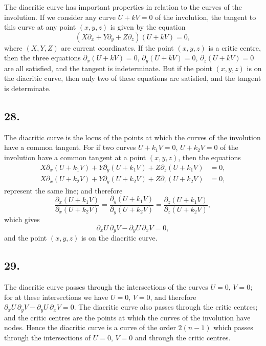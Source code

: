 \documentclass[11pt,a4paper]{article}
\theoremstyle{definition}
\begin{document}
The diacritic curve has important properties in relation to the curves of the involution.
If we consider any curve $U + kV = 0$ of the involution, the tangent to this curve at any
point $(x, y, z)$ is given by the equation
\[
(X\partial_{x} + Y\partial_{y} + Z\partial_{z})(U + kV) = 0,
\]
where $(X, Y, Z)$ are current coordinates. If the point $(x, y, z)$ is a critic centre, then the
three equations $\partial_{x}(U + kV) = 0$, $\partial_{y}(U + kV) = 0$, $\partial_{z}(U + kV) = 0$ are all satisfied, and the
tangent is indeterminate. But if the point $(x, y, z)$ is on the diacritic curve, then only
two of these equations are satisfied, and the tangent is determinate.

\subsection*{28.}

The diacritic curve is the locus of the points at which the curves of the involution
have a common tangent. For if two curves $U + k_{1}V = 0$, $U + k_{2}V = 0$ of the involution
have a common tangent at a point $(x, y, z)$, then the equations
\begin{align*}
X\partial_{x}(U + k_{1}V) + Y\partial_{y}(U + k_{1}V) + Z\partial_{z}(U + k_{1}V) &= 0,\\
X\partial_{x}(U + k_{2}V) + Y\partial_{y}(U + k_{2}V) + Z\partial_{z}(U + k_{2}V) &= 0,
\end{align*}
represent the same line; and therefore
\[
\frac{\partial_{x}(U + k_{1}V)}{\partial_{x}(U + k_{2}V)} =
\frac{\partial_{y}(U + k_{1}V)}{\partial_{y}(U + k_{2}V)} =
\frac{\partial_{z}(U + k_{1}V)}{\partial_{z}(U + k_{2}V)},
\]
which gives
\[
\partial_{x}U\,\partial_{y}V - \partial_{y}U\,\partial_{x}V = 0,
\]
and the point $(x, y, z)$ is on the diacritic curve.

\newpage
\subsection*{29.}

The diacritic curve passes through the intersections of the curves $U = 0$, $V = 0$; for at
these intersections we have $U = 0$, $V = 0$, and therefore $\partial_{x}U\,\partial_{y}V - \partial_{y}U\,\partial_{x}V = 0$.
The diacritic curve also passes through the critic centres; and the critic centres are the
points at which the curves of the involution have nodes. Hence the diacritic curve is
a curve of the order $2(n - 1)$ which passes through the intersections of $U = 0$, $V = 0$ and
through the critic centres.
\end{document}
